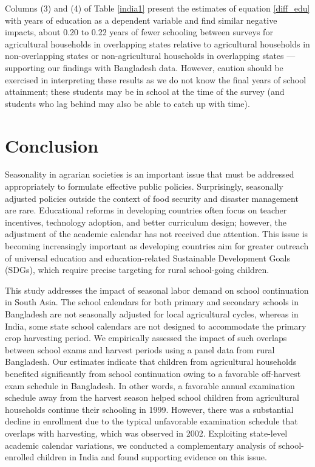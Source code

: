 \documentclass[12pt,letterpaper]{article}
\newcommand{\0}{\ensuremath{\mbox{\boldmath $0$}}}
\begin{document}
Columns (3) and (4) of Table \ref{india1} present the estimates of equation \ref{diff_edu} with years of education as a dependent variable and find similar negative impacts, about 0.20 to 0.22 years of fewer schooling between surveys for agricultural households in overlapping states relative to agricultural households in non-overlapping states or non-agricultural households in overlapping states --- supporting our findings with Bangladesh data. However, caution should be exercised in interpreting these results as we do not know the final years of school attainment; these students may be in school at the time of the survey (and students who lag behind may also be able to catch up with time).


\section{Conclusion}


Seasonality in agrarian societies is an important issue that must be addressed appropriately to formulate effective public policies. Surprisingly, seasonally adjusted policies outside the context of food security and disaster management are rare. Educational reforms in developing countries often focus on teacher incentives, technology adoption, and better curriculum design; however, the adjustment of the academic calendar has not received due attention. This issue is becoming increasingly important as developing countries aim for greater outreach of universal education and education-related Sustainable Development Goals (SDGs), which require precise targeting for rural school-going children.

This study addresses the impact of seasonal labor demand on school continuation in South Asia. The school calendars for both primary and secondary schools in Bangladesh are not seasonally adjusted for local agricultural cycles, whereas in India, some state school calendars are not designed to accommodate the primary crop harvesting period. We empirically assessed the impact of such overlaps between school exams and harvest periods using a panel data from rural Bangladesh. Our estimates indicate that children from agricultural households benefited significantly from school continuation owing to a favorable off-harvest exam schedule in Bangladesh. In other words, a favorable annual examination schedule away from the harvest season helped school children from agricultural households continue their schooling in 1999. However, there was a substantial decline in enrollment due to the typical unfavorable examination schedule that overlaps with harvesting, which was observed in 2002. Exploiting state-level academic calendar variations, we conducted a complementary analysis of school-enrolled children in India and found supporting evidence on this issue.
\end{document}
